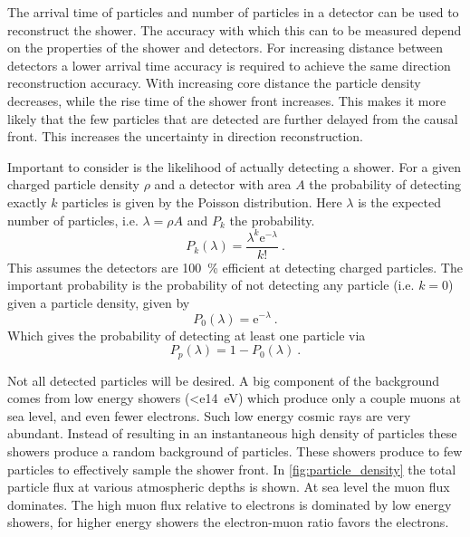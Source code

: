 The arrival time of particles and number of particles in a detector can be used to reconstruct the shower. The accuracy with which this can to be measured depend on the properties of the shower and detectors. For increasing distance between detectors a lower arrival time accuracy is required to achieve the same direction reconstruction accuracy. With increasing core distance the particle density decreases, while the rise time of the shower front increases. This makes it more likely that the few particles that are detected are further delayed from the causal front. This increases the uncertainty in direction reconstruction.

Important to consider is the likelihood of actually detecting a shower. For a given charged particle density $\rho$ and a detector with area $A$ the probability of detecting exactly $k$ particles is given by the Poisson distribution. Here $\lambda$ is the expected number of particles, i.e. $\lambda = \rho A$ and $P_k$ the probability.
%
\begin{equation}
    P_k(\lambda) = \frac{\lambda^k \mathrm{e}^{-\lambda}}{k!} \ .
\end{equation}
%
This assumes the detectors are \SI{100}{\percent} efficient at detecting charged particles. The important probability is the probability of not detecting any particle (i.e. $k = 0$) given a particle density, given by
%
\begin{equation}
    P_0(\lambda) = \mathrm{e}^{-\lambda} \ .
\end{equation}
%
Which gives the probability of detecting at least one particle via
%
\begin{equation}
    P_p(\lambda) = 1-P_0(\lambda) \ .
\end{equation}

Not all detected particles will be desired. A big component of the background comes from low energy showers (\SI{<e14}{\eV}) which produce only a couple muons at sea level, and even fewer electrons. Such low energy cosmic rays are very abundant. Instead of resulting in an instantaneous high density of particles these showers produce a random background of particles. These showers produce to few particles to effectively sample the shower front. In \cref{fig:particle_density} the total particle flux at various atmospheric depths is shown. At sea level the muon flux dominates. The high muon flux relative to electrons is dominated by low energy showers, for higher energy showers the electron-muon ratio favors the electrons.

